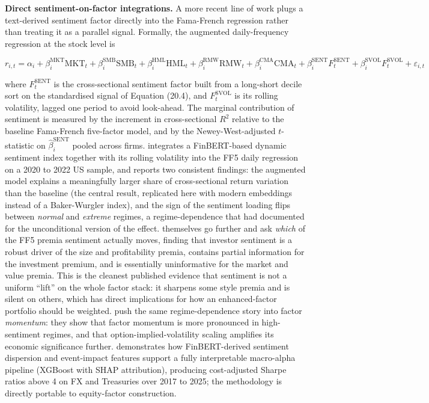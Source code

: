 \textbf{Direct sentiment-on-factor integrations.} A more recent line of work plugs a text-derived sentiment factor directly into the Fama-French regression rather than treating it as a parallel signal. Formally, the augmented daily-frequency regression at the stock level is

\begin{equation}
r_{i,t} = \alpha_i + \beta_i^{\text{MKT}} \text{MKT}_t + \beta_i^{\text{SMB}} \text{SMB}_t + \beta_i^{\text{HML}} \text{HML}_t + \beta_i^{\text{RMW}} \text{RMW}_t + \beta_i^{\text{CMA}} \text{CMA}_t + \beta_i^{\text{SENT}} F^{\text{SENT}}_t + \beta_i^{\text{SVOL}} F^{\text{SVOL}}_t + \varepsilon_{i,t}
\tag{21.6}
\end{equation}

where $F^{\text{SENT}}_t$ is the cross-sectional sentiment factor built from a long-short decile sort on the standardised signal of Equation (20.4), and $F^{\text{SVOL}}_t$ is its rolling volatility, lagged one period to avoid look-ahead. The marginal contribution of sentiment is measured by the increment in cross-sectional $R^2$ relative to the baseline Fama-French five-factor model, and by the Newey-West-adjusted $t$-statistic on $\hat\beta_i^{\text{SENT}}$ pooled across firms. \cite{zhang2025finbertff5} integrates a FinBERT-based dynamic sentiment index together with its rolling volatility into the FF5 daily regression on a 2020 to 2022 US sample, and reports two consistent findings: the augmented model explains a meaningfully larger share of cross-sectional return variation than the baseline (the central \cite{habibah2021investor} result, replicated here with modern embeddings instead of a Baker-Wurgler index), and the sign of the sentiment loading flips between \textit{normal} and \textit{extreme} regimes, a regime-dependence that \cite{garcia2013sentiment} had documented for the unconditional version of the effect. \cite{habibah2021investor} themselves go further and ask \textit{which} of the FF5 premia sentiment actually moves, finding that investor sentiment is a robust driver of the size and profitability premia, contains partial information for the investment premium, and is essentially uninformative for the market and value premia. This is the cleanest published evidence that sentiment is not a uniform ``lift'' on the whole factor stack: it sharpens some style premia and is silent on others, which has direct implications for how an enhanced-factor portfolio should be weighted. \cite{grobys2021factor} push the same regime-dependence story into factor \textit{momentum}: they show that factor momentum is more pronounced in high-sentiment regimes, and that option-implied-volatility scaling amplifies its economic significance further. \cite{zhang2025macroalpha} demonstrates how FinBERT-derived sentiment dispersion and event-impact features support a fully interpretable macro-alpha pipeline (XGBoost with SHAP attribution), producing cost-adjusted Sharpe ratios above 4 on FX and Treasuries over 2017 to 2025; the methodology is directly portable to equity-factor construction.

